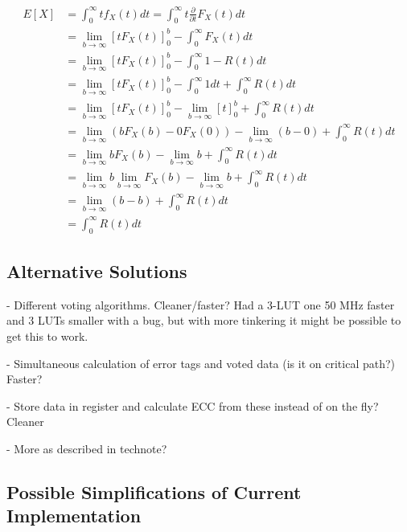 \begin{align*}
  E[X] &= \int_0^{\infty}tf_X(t)dt = \int_0^{\infty}t\frac{\partial}{\partial t} F_X(t)dt \\
       &= \lim_{b \to \infty}[tF_X(t)]_{0}^b - \int_0^{\infty}F_X(t)dt \\
       &= \lim_{b \to \infty}[tF_X(t)]_0^b - \int_0^{\infty}1 - R(t)dt \\
       &= \lim_{b \to \infty}[tF_X(t)]_0^b - \int_0^\infty1dt + \int_0^{\infty}R(t)dt \\
       &= \lim_{b \to \infty}[tF_X(t)]_0^b - \lim_{b \to \infty}[t]_0^b + \int_0^{\infty}R(t)dt \\
       &= \lim_{b \to \infty}(bF_X(b) - 0F_X(0)) - \lim_{b \to \infty}(b - 0) + \int_0^{\infty}R(t)dt \\
       &= \lim_{b \to \infty}bF_X(b) - \lim_{b \to \infty}b + \int_0^{\infty}R(t)dt \\
       &= \lim_{b \to \infty}b\lim_{b \to \infty}F_X(b) - \lim_{b \to \infty}b + \int_0^{\infty}R(t)dt \\
       &= \lim_{b \to \infty}(b - b) + \int_0^{\infty}R(t)dt \\
       &= \int_0^{\infty}R(t)dt
\end{align*}





\subsection{Alternative Solutions}
- Different voting algorithms. Cleaner/faster? Had a 3-LUT one 50 MHz
faster and 3 LUTs smaller with a bug, but with more tinkering it might
be possible to get this to work. 

- Simultaneous calculation of error tags and voted data (is it on
critical path?) Faster?

- Store data in register and calculate ECC from these instead of on
the fly? Cleaner

- More as described in technote?

\subsection{Possible Simplifications of Current Implementation}

